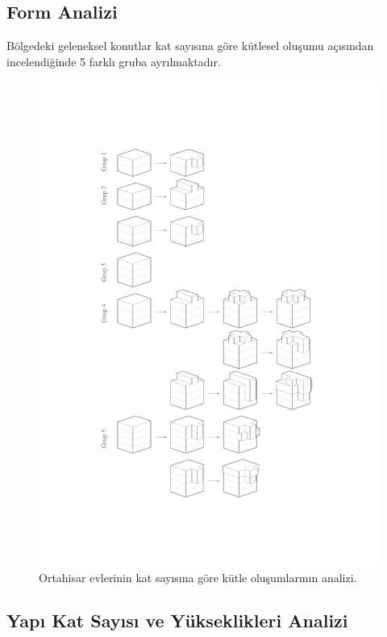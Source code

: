\documentclass[12pt,turkish,a4paperpaper,]{report}
\begin{document}
\hypertarget{form-analizi}{%
\subsection{Form Analizi}\label{form-analizi}}

Bölgedeki geleneksel konutlar kat sayısına göre kütlesel oluşumu
açısından incelendiğinde 5 farklı gruba ayrılmaktadır.

\begin{figure}
\centering
\includegraphics[width=1\textwidth,height=\textheight]{source/figures/kutlegrameri.pdf}
\caption{Ortahisar evlerinin kat sayısına göre kütle oluşumlarının
analizi. \label{katgruplama}}
\end{figure}

\newpage

\hypertarget{yapux131-kat-sayux131sux131-ve-yuxfckseklikleri-analizi}{%
\subsection{Yapı Kat Sayısı ve Yükseklikleri
Analizi}\label{yapux131-kat-sayux131sux131-ve-yuxfckseklikleri-analizi}}
\end{document}

